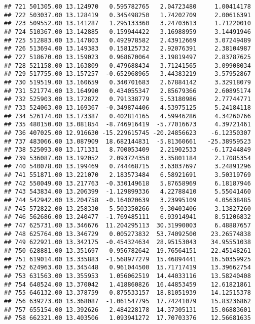 \documentclass[
]{article}
\begin{document}
\begin{verbatim}
## 721 501305.00 13.124970   0.595782765   2.04723480     1.00414178
## 722 503037.00 13.128419   0.345498250   1.74202709     2.00616391
## 723 509552.00 13.141287   1.295133360   3.24703613     1.71220010
## 724 510367.00 13.142885   0.159944422   3.16988959     3.14491946
## 725 512883.00 13.147803   0.492978582   2.43912669     3.07249489
## 726 513694.00 13.149383   0.158125732   2.92076391     2.38104987
## 727 518670.00 13.159023   0.968670064   3.19819497     2.83787625
## 728 521158.00 13.163809   0.479688434   3.71241565     3.09908034
## 729 517755.00 13.157257  -0.652968965   3.44383219     3.57952867
## 730 519519.00 13.160659   0.340701683   2.67884142     3.32918079
## 731 521774.00 13.164990   0.434055347   2.85679366     2.60895174
## 732 525903.00 13.172872   0.791338779   5.53180986     2.77744771
## 733 524063.00 13.169367  -0.349874406   4.53975125     5.24184118
## 734 526174.00 13.173387   0.402814165   4.59946286     4.34260766
## 735 480150.00 13.081854  -8.746916419  -5.77016673     4.39721461
## 736 407025.00 12.916630 -15.229615745 -20.24856623    -6.12350307
## 737 483066.00 13.087909  18.682144831  -5.81360661   -25.38959523
## 738 525093.00 13.171331   8.700053409   2.21902533    -6.17244849
## 739 536087.00 13.192052   2.093724350   3.35801184     2.17085354
## 740 540078.00 13.199469   0.744468715   3.63037697     3.24891296
## 741 551871.00 13.221070   2.183573484   6.58921691     3.50319769
## 742 550049.00 13.217763  -0.330149618   5.87658969     6.18187946
## 743 543834.00 13.206399  -1.129899336   4.22788410     5.55041460
## 744 542942.00 13.204758  -0.164020639   3.23995109     4.05638485
## 745 572822.00 13.258330   5.503350266   9.30403406     3.13827260
## 746 562686.00 13.240477  -1.769485111   6.93914941     8.51206832
## 747 625731.00 13.346676  11.204295113  30.31990003     6.48887657
## 748 625764.00 13.346729   0.005273832  53.74092500    23.26574838
## 749 622921.00 13.342175  -0.454324634  28.95153043    34.95551038
## 750 628881.00 13.351697   0.956782642  19.76564151    22.45148261
## 751 619014.00 13.335883  -1.568977279  15.46894441    16.50359925
## 752 624963.00 13.345448   0.961044500  15.71717419    13.39662754
## 753 631563.00 13.355953   1.056062519  14.44033116    13.58240408
## 754 640524.00 13.370042   1.418860826  16.44853459    12.61821861
## 755 646132.00 13.378759   0.875533157  18.81051939    14.12515378
## 756 639273.00 13.368087  -1.061547795  17.74241079    15.83236862
## 757 655154.00 13.392626   2.484228178  14.37305131    15.06883601
## 758 662321.00 13.403506   1.093941272  17.70703376    12.56681635

\end{verbatim}
\end{document}
